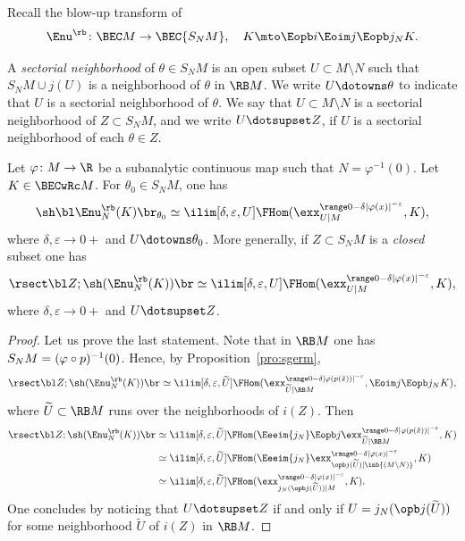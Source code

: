 Recall the blow-up transform of \cite[\S4.4]{DK19nu}
\[
\Enu^\rb\colon\BEC M \to \BEC{S_NM},\quad
K\mto \Eopb i\Eoim j\Eopb j_N K.
\]

A \emph{sectorial neighborhood} of $\theta\in S_NM$ is an open subset $U\subset M\setminus N$ such that $S_N M\cup j (U)$ is a neighborhood of $\theta$ in $\RB M$. We write $U \dotowns \theta$ to indicate that $U$ is a sectorial neighborhood of $\theta$.
We say that $U\subset M\setminus N$ is a sectorial neighborhood of $Z\subset S_NM$, and we write $U\dotsupset Z$, if $U$ is a sectorial neighborhood of each $\theta\in Z$.

\begin{lemma}\label{lem:psiphigerm}
Let $\varphi\colon M\to \R$ be a subanalytic continuous map such that
$N = \varphi^{-1}(0)$.
Let $K\in\BECwRc M$.
For $\theta_0\in S_NM$, one has
\[
\sh\bl\Enu^\rb_N(K)\br_{\theta_0} \simeq
\ilim[\delta,\varepsilon, U]
\FHom( \exx^{\range0{-\delta|\varphi(x)|^{-\varepsilon}}}_{U|M} , K),
\]
where $\delta,\varepsilon\to 0+$ and $U\dotowns \theta_0$.
More generally, if $Z\subset S_NM$ is a \emph{closed} subset one has
\[
\rsect\bl Z;\sh(\Enu^\rb_N(K))\br \simeq
\ilim[\delta,\varepsilon,U]
\FHom( \exx^{\range0{-\delta|\varphi(x)|^{-\varepsilon}}}_{U|M} , K),
\]
where $\delta,\varepsilon\to 0+$ and $U\dotsupset Z$.
\end{lemma}

\begin{proof}
Let us prove the last statement. Note that in $\RB M$ one has $S_NM = (\varphi\circ\nobreak p)^{-1}(0)$. Hence, by Proposition~\ref{pro:sgerm},
\[
\rsect\bl Z;\sh(\Enu^\rb_N(K))\br
\simeq \ilim[\delta,\varepsilon,\widetilde U]\FHom(\exx^{\range0{-\delta|\varphi(p(\tilde x))|^{-\varepsilon}}}_{\widetilde U|\RB M},\Eoim j\Eopb j_N K),
\]
where $\widetilde U\subset\RB M$ runs over the neighborhoods of $i(Z)$.
Then
\begin{align*}
\rsect\bl Z;\sh(\Enu^\rb_N(K))\br
&\simeq \ilim[\delta,\varepsilon,\widetilde U]\FHom(\Eeeim{{j_N}}\Eopb j\exx^{\range0{-\delta|\varphi(p(\tilde x))|^{-\varepsilon}}}_{\widetilde U|\RB M}, K) \\
&\simeq \ilim[\delta,\varepsilon,\widetilde U]\FHom(\Eeeim{{j_N}}\exx^{\range0{-\delta|\varphi(x)|^{-\varepsilon}}}_{\opb j(\widetilde U)|\inb{(M\setminus N)}}, K) \\
&\simeq \ilim[\delta,\varepsilon,\widetilde U]\FHom(\exx^{\range0{-\delta|\varphi(x)|^{-\varepsilon}}}_{j_N(\opb j(\widetilde U))|M},K).
\end{align*}
One concludes by noticing that $U\dotsupset Z$ if and only if $U=j_N(\opb j(\widetilde U))$ for some neighborhood $\widetilde U$ of $i(Z)$ in $\RB M$.
\end{proof}

